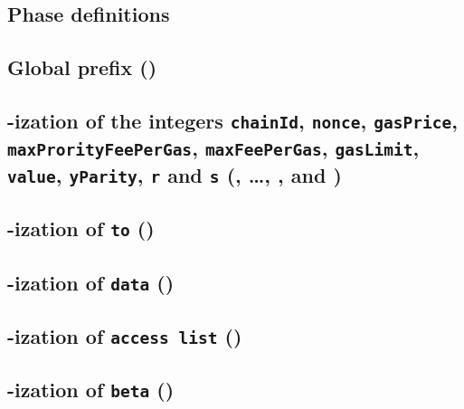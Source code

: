 \def\localSectionTitle {\rlp{}-ization of the integers \texttt{chainId}, \texttt{nonce}, \texttt{gasPrice}, \texttt{maxProrityFeePerGas}, \texttt{maxFeePerGas}, \texttt{gasLimit}, \texttt{value}, \texttt{yParity}, \texttt{r} and \texttt{s} }

\subsection{Phase definitions}                                                                    \label{rlp txn: phase constraints: definitions}    
\subsection{Global \rlp{} prefix (\phaseRlpPrefix)}                                               \label{rlp txn: phase constraints: rlp prefix}     
\subsection{\localSectionTitle{} (\phaseChainId{}, \dots, \phaseY{}, \phaseR{} and \phaseS{})}    \label{rlp txn: phase constraints: integers}       
\subsection{\rlp{}-ization of \texttt{to} (\phaseTo)}                                             \label{rlp txn: phase constraints: to address}         
\subsection{\rlp{}-ization of \texttt{data} (\phaseData)}                                         \label{rlp txn: phase constraints: payload}        
\subsection{\rlp{}-ization of \texttt{access list} (\phaseAccessList)}                            \label{rlp txn: phase constraints: access list}    
\subsection{\rlp{}-ization of \texttt{beta} (\phaseBeta)}                                         \label{rlp txn: phase constraints: beta}           
